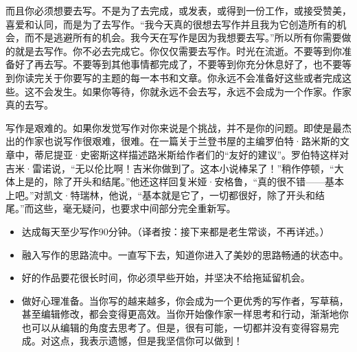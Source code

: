 \documentclass{ctexart}
\begin{document}
而且你必须想要去写。不是为了去完成，或发表，或得到一份工作，或接受赞美，喜爱和认同，而是为了去写作。“我今天真的很想去写作并且我为它创造所有的机会，而不是逃避所有的机会。我今天在写作是因为我想要去写。”所以所有你需要做的就是去写作。你不必去完成它。你仅仅需要去写作。时光在流逝。不要等到你准备好了再去写。不要等到其他事情都完成了，不要等到你充分休息好了，也不要等到你读完关于你要写的主题的每一本书和文章。你永远不会准备好这些或者完成这些。这不会发生。如果你等待，你就永远不会去写，永远不会成为一个作家。作家真的去写。

写作是艰难的。如果你发觉写作对你来说是个挑战，并不是你的问题。即使是最杰出的作家也说写作很艰难，很难。在一篇关于兰登书屋的主编罗伯特·路米斯的文章中，蒂尼提亚·史密斯这样描述路米斯给作者们的“友好的建议”。罗伯特这样对吉米·雷诺说，“无以伦比啊！吉米你做到了。这本小说棒呆了！”稍作停顿，“大体上是的，除了开头和结尾。”他还这样回复米娅·安格鲁，“真的很不错——基本上吧。”对凯文·特瑞林，他说，“基本就是它了，一切都很好，除了开头和结尾。”而这些，毫无疑问，也要求中间部分完全重新写。

\begin{itemize}
\item 达成每天至少写作90分钟。（译者按：接下来都是老生常谈，不再详述。）
\item 融入写作的思路流中。一直写下去，知道你进入了美妙的思路畅通的状态中。
\item 好的作品要花很长时间，你必须早些开始，并坚决不给拖延留机会。
\item 做好心理准备。当你写的越来越多，你会成为一个更优秀的写作者，写草稿，甚至编辑修改，都会变得更高效。当你开始像作家一样思考和行动，渐渐地你也可以从编辑的角度去思考了。但是，很有可能，一切都并没有变得容易完成。对这点，我表示遗憾，但是我坚信你可以做到！
\end{itemize}
\end{document}
